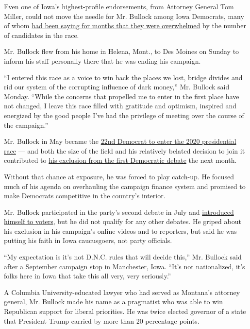 Even one of Iowa's highest-profile endorsements, from Attorney General
Tom Miller, could not move the needle for Mr. Bullock among Iowa
Democrats, many of whom
\href{https://www.nytimes.com/2019/06/09/us/politics/iowa-democrats-2020.html}{had
been saying for months that they were overwhelmed} by the number of
candidates in the race.

Mr. Bullock flew from his home in Helena, Mont., to Des Moines on Sunday
to inform his staff personally there that he was ending his campaign.

``I entered this race as a voice to win back the places we lost, bridge
divides and rid our system of the corrupting influence of dark money,''
Mr. Bullock said Monday. ``While the concerns that propelled me to enter
in the first place have not changed, I leave this race filled with
gratitude and optimism, inspired and energized by the good people I've
had the privilege of meeting over the course of the campaign.''

Mr. Bullock in May became the
\href{https://www.nytimes.com/2019/05/14/us/politics/steve-bullock-2020.html}{22nd
Democrat to enter the 2020 presidential race} --- and both the size of
the field and his relatively belated decision to join it contributed to
\href{https://www.nytimes.com/2019/06/26/us/politics/steve-bullock-democrats-2020.html}{his
exclusion from the first Democratic debate} the next month.

Without that chance at exposure, he was forced to play catch-up. He
focused much of his agenda on overhauling the campaign finance system
and promised to make Democrats competitive in the country's interior.

Mr. Bullock participated in the party's second debate in July and
\href{https://www.nytimes.com/2019/07/31/us/politics/who-won-democratic-debate.html}{introduced
himself to voters}, but he did not qualify for any other debates. He
griped about his exclusion in his campaign's online videos and to
reporters, but said he was putting his faith in Iowa caucusgoers, not
party officials.

``My expectation is it's not D.N.C. rules that will decide this,'' Mr.
Bullock said after a September campaign stop in Manchester, Iowa. ``It's
not nationalized, it's folks here in Iowa that take this all very, very
seriously.''

A Columbia University-educated lawyer who had served as Montana's
attorney general, Mr. Bullock made his name as a pragmatist who was able
to win Republican support for liberal priorities. He was twice elected
governor of a state that President Trump carried by more than 20
percentage points.


